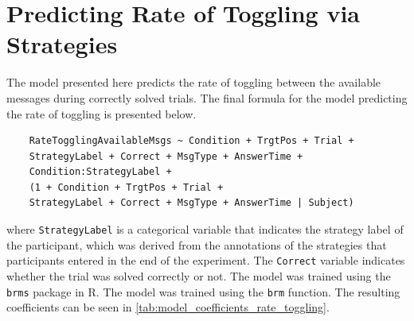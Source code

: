 \section{Predicting Rate of Toggling via Strategies}
\label{sec:rate_toggling_strtg}

The model presented here predicts the rate of toggling between the available messages during correctly solved trials. The final formula for the model predicting the rate of toggling is presented below.

\begin{verbatim}
    RateTogglingAvailableMsgs ~ Condition + TrgtPos + Trial +
    StrategyLabel + Correct + MsgType + AnswerTime +
    Condition:StrategyLabel +
    (1 + Condition + TrgtPos + Trial +
    StrategyLabel + Correct + MsgType + AnswerTime | Subject)
\end{verbatim}

where \texttt{StrategyLabel} is a categorical variable that indicates the strategy label of the participant, which was derived from the annotations of the strategies that participants entered in the end of the experiment. The \texttt{Correct} variable indicates whether the trial was solved correctly or not. The model was trained using the \texttt{brms} package in R. The model was trained using the \texttt{brm} function. The resulting coefficients can be seen in \autoref{tab:model_coefficients_rate_toggling}.



